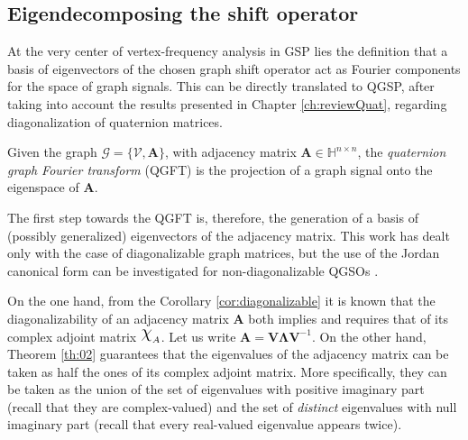 \subsection{Eigendecomposing the shift operator}
\label{subsec:eigendecomposition}
At the very center of vertex-frequency analysis in GSP lies the definition that a basis of eigenvectors of the chosen graph shift operator act as Fourier components for the space of graph signals. This can be directly translated to QGSP, after taking into account the results presented in Chapter \ref{ch:reviewQuat}, regarding diagonalization of quaternion matrices.

\begin{definition}
    Given the graph $\mathcal{G} = \{\mathcal{V}, \mathbf{A}\}  $,  with adjacency matrix $ \mathbf{A} \in \mathbb{H}^{n \times n}$, the \textit{quaternion graph Fourier transform} (QGFT) is the projection of a graph signal onto the eigenspace of $\mathbf{A}$.
\end{definition}

The first step towards the QGFT is, therefore, the generation of a basis of (possibly generalized) eigenvectors of the adjacency matrix. This work has dealt only with the case of diagonalizable graph matrices, but the use of the Jordan canonical form can be investigated for non-diagonalizable QGSOs \parencite{Longxuan1996}.

On the one hand, from the Corollary \ref{cor:diagonalizable} it is known that the diagonalizability of an adjacency matrix $\mathbf{A}$ both implies and requires that of its complex adjoint matrix $\rchi_A$. Let us write $\mathbf{A} = \mathbf{V} \mathbf{\Lambda} \mathbf{V}^{-1}$. On the other hand, Theorem \ref{th:02} guarantees that the eigenvalues of the adjacency matrix can be taken as half the ones of its complex adjoint matrix. More specifically, they can be taken as the union of the set of eigenvalues with positive imaginary part (recall that they are complex-valued) and the set of \textit{distinct} eigenvalues with null imaginary part (recall that every real-valued eigenvalue appears twice).

